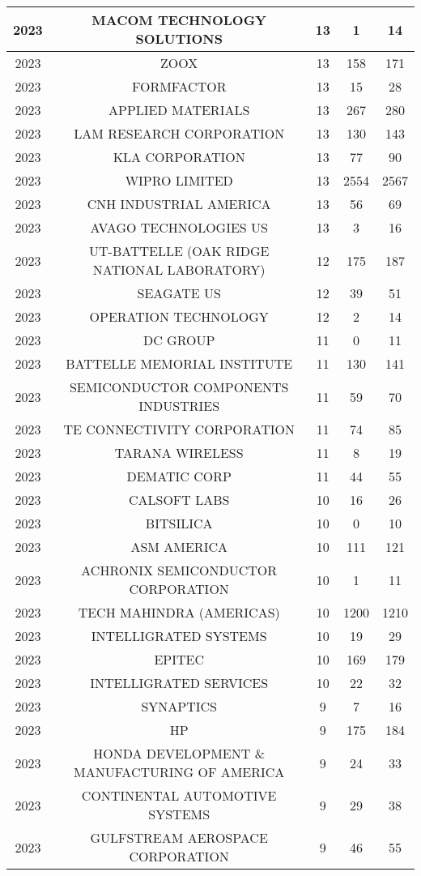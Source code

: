 \documentclass{article}%
\begin{document}
\begin{longtable}{c|c|c|c|c}
\hline%
2023&MACOM TECHNOLOGY SOLUTIONS&13&1&14\\%
\hline%
2023&ZOOX&13&158&171\\%
\hline%
2023&FORMFACTOR&13&15&28\\%
\hline%
2023&APPLIED MATERIALS&13&267&280\\%
\hline%
2023&LAM RESEARCH CORPORATION&13&130&143\\%
\hline%
2023&KLA CORPORATION&13&77&90\\%
\hline%
2023&WIPRO LIMITED&13&2554&2567\\%
\hline%
2023&CNH INDUSTRIAL AMERICA&13&56&69\\%
\hline%
2023&AVAGO TECHNOLOGIES US&13&3&16\\%
\hline%
2023&UT{-}BATTELLE  (OAK RIDGE NATIONAL LABORATORY)&12&175&187\\%
\hline%
2023&SEAGATE US&12&39&51\\%
\hline%
2023&OPERATION TECHNOLOGY&12&2&14\\%
\hline%
2023&DC GROUP&11&0&11\\%
\hline%
2023&BATTELLE MEMORIAL INSTITUTE&11&130&141\\%
\hline%
2023&SEMICONDUCTOR COMPONENTS INDUSTRIES&11&59&70\\%
\hline%
2023&TE CONNECTIVITY CORPORATION&11&74&85\\%
\hline%
2023&TARANA WIRELESS&11&8&19\\%
\hline%
2023&DEMATIC CORP&11&44&55\\%
\hline%
2023&CALSOFT LABS&10&16&26\\%
\hline%
2023&BITSILICA&10&0&10\\%
\hline%
2023&ASM AMERICA&10&111&121\\%
\hline%
2023&ACHRONIX SEMICONDUCTOR CORPORATION&10&1&11\\%
\hline%
2023&TECH MAHINDRA (AMERICAS)&10&1200&1210\\%
\hline%
2023&INTELLIGRATED SYSTEMS&10&19&29\\%
\hline%
2023&EPITEC&10&169&179\\%
\hline%
2023&INTELLIGRATED SERVICES&10&22&32\\%
\hline%
2023&SYNAPTICS&9&7&16\\%
\hline%
2023&HP&9&175&184\\%
\hline%
2023&HONDA DEVELOPMENT \& MANUFACTURING OF AMERICA&9&24&33\\%
\hline%
2023&CONTINENTAL AUTOMOTIVE SYSTEMS&9&29&38\\%
\hline%
2023&GULFSTREAM AEROSPACE CORPORATION&9&46&55\\%

\end{longtable}
\end{document}
